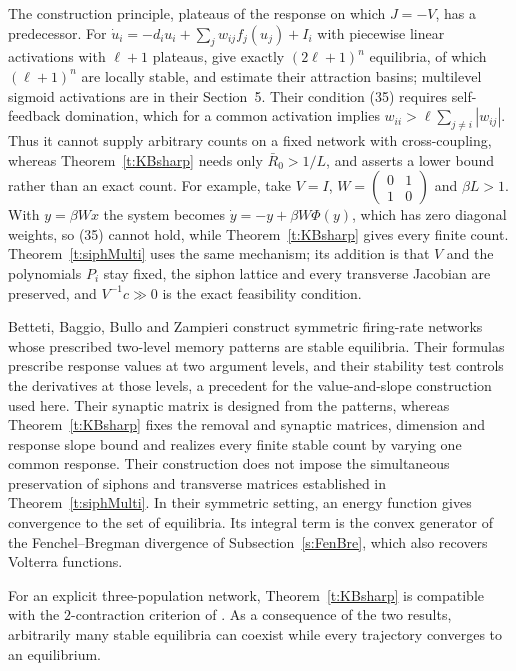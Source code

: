 \begin{enumerate}
The construction principle, plateaus of the response on which $J=-V$, has a predecessor.
For $\dot u_i=-d_iu_i+\sum_jw_{ij}f_j(u_j)+I_i$ with piecewise linear
activations with $\ell+1$ plateaus, \cite[Theorem~3]{WangLuChen2010} give exactly
$(2\ell+1)^n$ equilibria, of which $(\ell+1)^n$ are locally stable, and estimate their
attraction basins; multilevel sigmoid activations are in their Section~5. Their condition (35)
requires self-feedback domination, which for a common activation implies
$w_{ii}>\ell\sum_{j\ne i}|w_{ij}|$. Thus it
cannot supply arbitrary counts on a fixed network with cross-coupling, whereas
Theorem~\ref{t:KBsharp} needs only $\bar R_0>1/L$, and asserts a lower bound rather than an exact count.
For example, take $V=I$, $W=\begin{pmatrix}0&1\\1&0\end{pmatrix}$ and $\beta L>1$. With
$y=\beta Wx$ the system becomes $\dot y=-y+\beta W\Phi(y)$, which has zero diagonal weights, so
(35) cannot hold, while Theorem~\ref{t:KBsharp} gives every finite count.
Theorem~\ref{t:siphMulti} uses the same mechanism; its addition is that $V$ and the
polynomials $P_i$ stay fixed, the siphon lattice and every transverse Jacobian are preserved,
and $V^{-1}c\gg0$ is the exact feasibility condition.

Betteti, Baggio, Bullo and Zampieri \cite{Betteti2025} construct symmetric firing-rate networks
whose prescribed two-level memory patterns are stable equilibria. Their formulas prescribe
response values at two argument levels, and their stability test controls the derivatives at those
levels, a precedent for the value-and-slope construction used here. Their synaptic matrix is
designed from the patterns, whereas Theorem~\ref{t:KBsharp} fixes the removal and synaptic matrices, dimension
and response slope bound and realizes every finite stable count by varying one common response.
Their construction does not impose the simultaneous preservation of siphons and transverse
matrices established in Theorem~\ref{t:siphMulti}. In their symmetric setting, an energy function
gives convergence to the set of equilibria. Its integral term is the convex generator of the
Fenchel--Bregman divergence of Subsection~\ref{s:FenBre}, which also recovers Volterra functions.

For an explicit three-population network, Theorem~\ref{t:KBsharp} is compatible with the
$2$-contraction criterion of \cite{OfirOvseevichMargaliot2024}. As a consequence of the two
results, arbitrarily many stable equilibria can coexist while every trajectory converges to an
equilibrium.


\end{enumerate}
